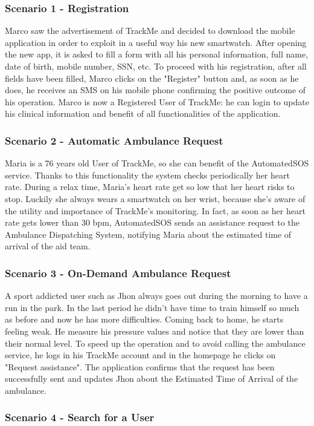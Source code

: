 \documentclass[12pt,a4paper]{article}
\begin{document}
	\subsubsection*{Scenario 1 - Registration}
	Marco saw the advertisement of TrackMe and decided to download the mobile application in order to exploit in a useful way his new smartwatch. After opening the new app, it is asked to fill a form with all his personal information, full name, date of birth, mobile number, SSN, etc. To proceed with his registration, after all fields have been filled, Marco clicks on the "Register" button and, as soon as he does, he receives an SMS on his mobile phone confirming the positive outcome of his operation. Marco is now a Registered User of TrackMe: he can login to update his clinical information and benefit of all functionalities of the application.
	\subsubsection*{Scenario 2 - Automatic Ambulance Request}
	Maria is a 76 years old User of TrackMe, so she can benefit of the AutomatedSOS service. Thanks to this functionality the system checks periodically her heart rate. During a relax time, Maria's heart rate get so low that her heart risks to stop. Luckily she always wears a smartwatch on her wrist, because she's aware of the utility and importance of TrackMe's monitoring. In fact, as soon as her heart rate gets lower than 30 bpm, AutomatedSOS sends an assistance request to the Ambulance Dispatching System, notifying Maria about the estimated time of arrival of the aid team.
	
	\subsubsection*{Scenario 3 - On-Demand Ambulance Request}
		A sport addicted user such as Jhon always goes out during the morning to have a run in the park. 
		In the last period he didn't have time to train himself so much as before and now he has more difficulties. Coming back to home, he starts feeling weak. He measure his pressure values and notice that they are lower than their normal level. To speed up the operation and to avoid calling the ambulance service, he logs in his TrackMe account and in the homepage he clicks on "Request assistance". The application confirms that the request has been successfully sent and updates Jhon about the Estimated Time of Arrival of the ambulance.
	
	\subsubsection*{Scenario 4 - Search for a User}
		
\end{document}
